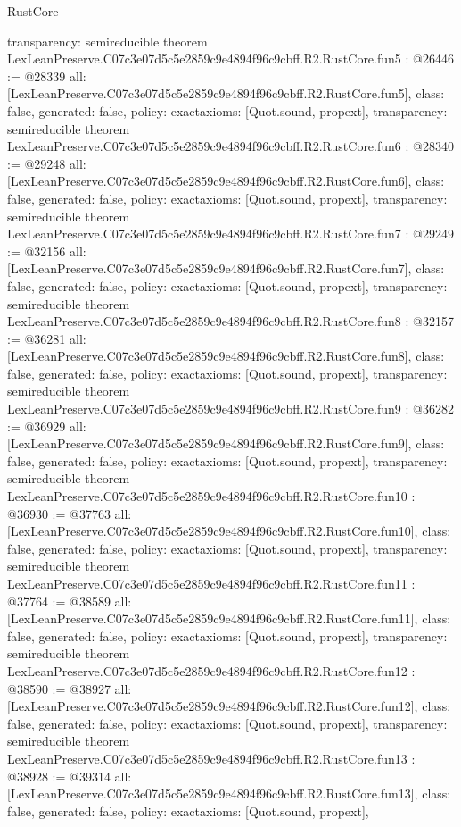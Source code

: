 \begin{lexlean}{RustCore}
\begin{coremodule}
{  transparency: semireducible
}
theorem LexLeanPreserve.C07c3e07d5c5e2859c9e4894f96c9cbff.R2.RustCore.fun5 : @26446 := @28339 {
  all: [LexLeanPreserve.C07c3e07d5c5e2859c9e4894f96c9cbff.R2.RustCore.fun5],
  class: false,
  generated: false,
  policy: exact{axioms: [Quot.sound, propext]},
  transparency: semireducible
}
theorem LexLeanPreserve.C07c3e07d5c5e2859c9e4894f96c9cbff.R2.RustCore.fun6 : @28340 := @29248 {
  all: [LexLeanPreserve.C07c3e07d5c5e2859c9e4894f96c9cbff.R2.RustCore.fun6],
  class: false,
  generated: false,
  policy: exact{axioms: [Quot.sound, propext]},
  transparency: semireducible
}
theorem LexLeanPreserve.C07c3e07d5c5e2859c9e4894f96c9cbff.R2.RustCore.fun7 : @29249 := @32156 {
  all: [LexLeanPreserve.C07c3e07d5c5e2859c9e4894f96c9cbff.R2.RustCore.fun7],
  class: false,
  generated: false,
  policy: exact{axioms: [Quot.sound, propext]},
  transparency: semireducible
}
theorem LexLeanPreserve.C07c3e07d5c5e2859c9e4894f96c9cbff.R2.RustCore.fun8 : @32157 := @36281 {
  all: [LexLeanPreserve.C07c3e07d5c5e2859c9e4894f96c9cbff.R2.RustCore.fun8],
  class: false,
  generated: false,
  policy: exact{axioms: [Quot.sound, propext]},
  transparency: semireducible
}
theorem LexLeanPreserve.C07c3e07d5c5e2859c9e4894f96c9cbff.R2.RustCore.fun9 : @36282 := @36929 {
  all: [LexLeanPreserve.C07c3e07d5c5e2859c9e4894f96c9cbff.R2.RustCore.fun9],
  class: false,
  generated: false,
  policy: exact{axioms: [Quot.sound, propext]},
  transparency: semireducible
}
theorem LexLeanPreserve.C07c3e07d5c5e2859c9e4894f96c9cbff.R2.RustCore.fun10 : @36930 := @37763 {
  all: [LexLeanPreserve.C07c3e07d5c5e2859c9e4894f96c9cbff.R2.RustCore.fun10],
  class: false,
  generated: false,
  policy: exact{axioms: [Quot.sound, propext]},
  transparency: semireducible
}
theorem LexLeanPreserve.C07c3e07d5c5e2859c9e4894f96c9cbff.R2.RustCore.fun11 : @37764 := @38589 {
  all: [LexLeanPreserve.C07c3e07d5c5e2859c9e4894f96c9cbff.R2.RustCore.fun11],
  class: false,
  generated: false,
  policy: exact{axioms: [Quot.sound, propext]},
  transparency: semireducible
}
theorem LexLeanPreserve.C07c3e07d5c5e2859c9e4894f96c9cbff.R2.RustCore.fun12 : @38590 := @38927 {
  all: [LexLeanPreserve.C07c3e07d5c5e2859c9e4894f96c9cbff.R2.RustCore.fun12],
  class: false,
  generated: false,
  policy: exact{axioms: [Quot.sound, propext]},
  transparency: semireducible
}
theorem LexLeanPreserve.C07c3e07d5c5e2859c9e4894f96c9cbff.R2.RustCore.fun13 : @38928 := @39314 {
  all: [LexLeanPreserve.C07c3e07d5c5e2859c9e4894f96c9cbff.R2.RustCore.fun13],
  class: false,
  generated: false,
  policy: exact{axioms: [Quot.sound, propext]},
}
\end{coremodule}
\end{lexlean}

